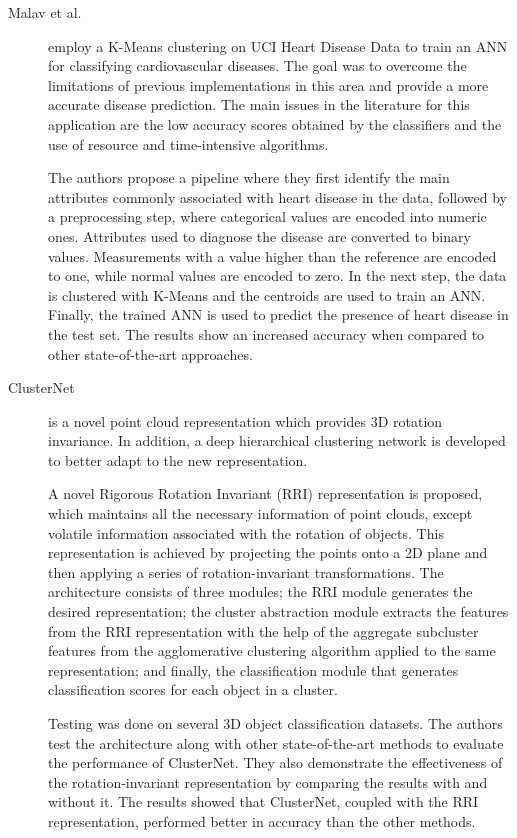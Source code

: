 \begin{description}
    \item[Malav et al.]\cite{Malav.Kadam.ea_PREDICTIONHEARTDISEASE_2017} employ a K-Means clustering on UCI Heart Disease Data to train an ANN for classifying cardiovascular diseases. The goal was to overcome the limitations of previous implementations in this area and provide a more accurate disease prediction. The main issues in the literature for this application are the low accuracy scores obtained by the classifiers and the use of resource and time-intensive algorithms.
    
    The authors propose a pipeline where they first identify the main attributes commonly associated with heart disease in the data, followed by a preprocessing step, where categorical values are encoded into numeric ones. Attributes used to diagnose the disease are converted to binary values. Measurements with a value higher than the reference are encoded to one, while normal values are encoded to zero. In the next step, the data is clustered with K-Means and the centroids are used to train an ANN. Finally, the trained ANN is used to predict the presence of heart disease in the test set. The results show an increased accuracy when compared to other state-of-the-art approaches.
\end{description}

\begin{description}
    \item[ClusterNet]\cite{Chen.Li.ea_ClusterNetDeepHierarchical_2019} is a novel point cloud representation which provides 3D rotation invariance. In addition, a deep hierarchical clustering network is developed to better adapt to the new representation.
    
    A novel Rigorous Rotation Invariant (RRI) representation is proposed, which maintains all the necessary information of point clouds, except volatile information associated with the rotation of objects. This representation is achieved by projecting the points onto a 2D plane and then applying a series of rotation-invariant transformations. The architecture consists of three modules; the RRI module generates the desired representation; the cluster abstraction module extracts the features from the RRI representation with the help of the aggregate subcluster features from the agglomerative clustering algorithm applied to the same representation; and finally, the classification module that generates classification scores for each object in a cluster.

    Testing was done on several 3D object classification datasets. The authors test the architecture along with other state-of-the-art methods to evaluate the performance of ClusterNet. They also demonstrate the effectiveness of the rotation-invariant representation by comparing the results with and without it. The results showed that ClusterNet, coupled with the RRI representation, performed better in accuracy than the other methods.
\end{description}

